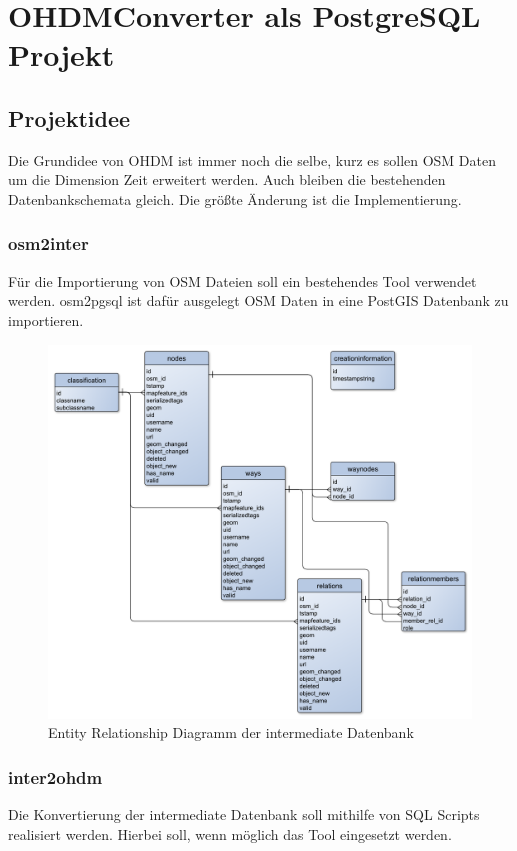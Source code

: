 \part{OHDMConverter als PostgreSQL Projekt}
\chapter{Projektidee}
Die Grundidee von \ac{OHDM} ist immer noch die selbe, kurz es sollen \ac{OSM} Daten um die Dimension Zeit erweitert werden. Auch bleiben die bestehenden Datenbankschemata gleich. Die größte Änderung ist die Implementierung.

\section{osm2inter}
Für die Importierung von \ac{OSM} Dateien soll ein bestehendes Tool \cite{osm2pgsql} verwendet werden. osm2pgsql ist dafür ausgelegt \ac{OSM} Daten in eine PostGIS Datenbank zu importieren.

\begin{figure}[h]
	\caption{Entity Relationship Diagramm der intermediate Datenbank}
	\label{fig:erd-inter}
	\includegraphics[width=\linewidth]{img/intermediate-db-erd.pdf}
\end{figure}

\section{inter2ohdm}
Die Konvertierung der intermediate Datenbank soll mithilfe von SQL Scripts realisiert werden. Hierbei soll, wenn möglich das Tool  eingesetzt werden.

